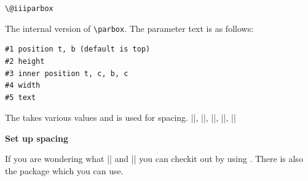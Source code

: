 \begin{teX}
\def\@iparbox[#1]{%
   \@ifnextchar[%
   {\@iiparbox{#1}}%
   {\@iiiparbox{#1}\relax[s]}}
\end{teX}


  

\begin{teX}
\def\@iiparbox#1[#2]{%
   \@ifnextchar[%
   {\@iiiparbox{#1}{#2}}%
   {\@iiiparbox{#1}{#2}[#1]}}
\end{teX}

\begin{teX}
   \let\@parboxto\@empty
\end{teX}

\hspace{-1cm}\texttt{\textbackslash @iiiparbox}

The internal version of \texttt{\textbackslash parbox}. The parameter text is as follows:

\begin{verbatim}
#1 position t, b (default is top)
#2 height
#3 inner position t, c, b, c
#4 width
#5 text
\end{verbatim}

\begin{teX}
  \long{}
\end{teX}

\noindent The  takes various values and is used for spacing. 
|\bm@l|, |\bm@r|, |\bm@s|, |\bm@t|, |\bm@b|


\textbf{Set up spacing}

\begin{teX}
  \def\bm@c{\hss\unhbox\@tempboxa\hss}
  \def\bm@l{\unhbox\@tempboxa\hss}\let\bm@t\bm@l
  \def\bm@r{\hss\unhbox\@tempboxa}\let\bm@b\bm@r
  \def\bm@s{\unhbox\@tempboxa}
\end{teX}


\noindent If you are wondering what |\@pboxswfalse| and |\@pboxswtrue| you can checkit out by using . There is also the package  which you can use.


